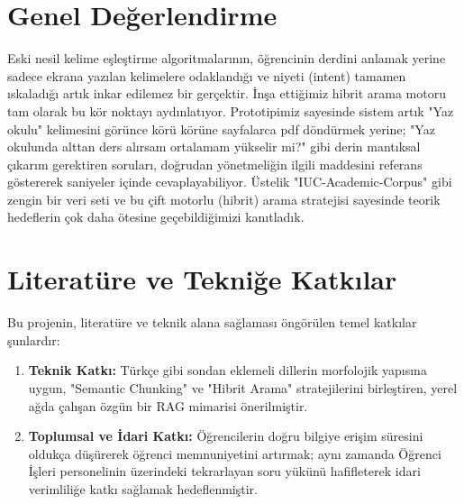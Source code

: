 \documentclass[12pt,a4paper]{report}
\begin{document}
\section{Genel Değerlendirme}
Eski nesil kelime eşleştirme algoritmalarının, öğrencinin derdini anlamak yerine sadece ekrana yazılan kelimelere odaklandığı ve niyeti (intent) tamamen ıskaladığı artık inkar edilemez bir gerçektir. İnşa ettiğimiz hibrit arama motoru tam olarak bu kör noktayı aydınlatıyor. Prototipimiz sayesinde sistem artık "Yaz okulu" kelimesini görünce körü körüne sayfalarca pdf döndürmek yerine; "Yaz okulunda alttan ders alırsam ortalamam yükselir mi?" gibi derin mantıksal çıkarım gerektiren soruları, doğrudan yönetmeliğin ilgili maddesini referans göstererek saniyeler içinde cevaplayabiliyor. Üstelik "IUC-Academic-Corpus" gibi zengin bir veri seti ve bu çift motorlu (hibrit) arama stratejisi sayesinde teorik hedeflerin çok daha ötesine geçebildiğimizi kanıtladık.

\section{Literatüre ve Tekniğe Katkılar}
Bu projenin, literatüre ve teknik alana sağlaması öngörülen temel katkılar şunlardır:
\begin{enumerate}
    \item \textbf{Teknik Katkı:} Türkçe gibi sondan eklemeli dillerin morfolojik yapısına uygun, "Semantic Chunking" ve "Hibrit Arama" stratejilerini birleştiren, yerel ağda çalışan özgün bir RAG mimarisi önerilmiştir.
    \item \textbf{Toplumsal ve İdari Katkı:} Öğrencilerin doğru bilgiye erişim süresini oldukça düşürerek öğrenci memnuniyetini artırmak; aynı zamanda Öğrenci İşleri personelinin üzerindeki tekrarlayan soru yükünü hafifleterek idari verimliliğe katkı sağlamak hedeflenmiştir.
\end{enumerate}

\newpage
\end{document}
